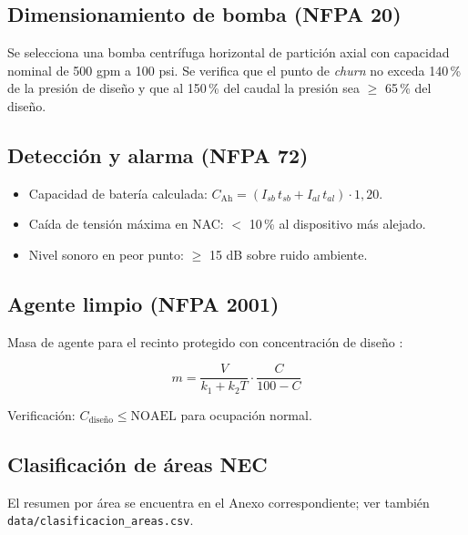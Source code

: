 \subsection{Dimensionamiento de bomba (NFPA 20)}

Se selecciona una bomba centrífuga horizontal de partición axial con capacidad nominal de 500 gpm a 100 psi. Se verifica que el punto de \textit{churn} no exceda 140\,\% de la presión de diseño y que al 150\,\% del caudal la presión sea $\ge$ 65\,\% del diseño.

\subsection{Detección y alarma (NFPA 72)}

\begin{itemize}
\item Capacidad de batería calculada: $C_{\text{Ah}} = (I_{sb}\,t_{sb} + I_{al}\,t_{al}) \cdot 1{,}20$.
\item Caída de tensión máxima en NAC: $<$ 10\,\% al dispositivo más alejado.
\item Nivel sonoro en peor punto: $\ge$ 15 dB sobre ruido ambiente.
\end{itemize}

\subsection{Agente limpio (NFPA 2001)}

Masa de agente \agenteLimpio{} para el recinto protegido con concentración de diseño \concentracionDiseno{}:

\begin{equation*}
m = \frac{V}{k_1 + k_2 T} \cdot \frac{C}{100 - C}
\end{equation*}

Verificación: $C_{\text{diseño}} \le \text{NOAEL}$ para ocupación normal.

\subsection{Clasificación de áreas NEC}

El resumen por área se encuentra en el Anexo correspondiente; ver también \texttt{data/clasificacion\_areas.csv}.
